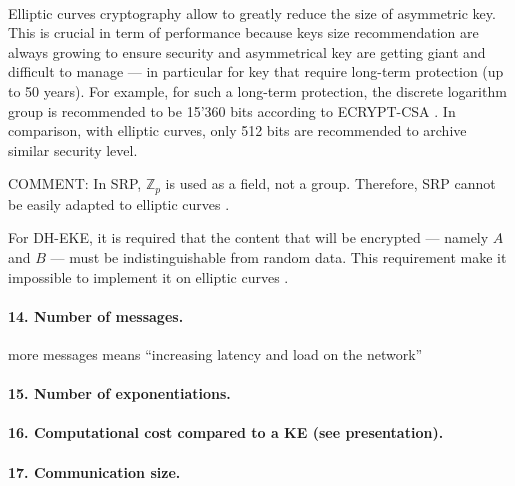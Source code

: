 \documentclass[../report.tex]{subfiles}
\begin{document}
\paragraph{}
Elliptic curves cryptography allow to greatly reduce the size of asymmetric key.
This is crucial in term of performance because keys size recommendation are always growing to ensure security and asymmetrical key are getting giant and difficult to manage --- in particular for key that require long-term protection (up to 50 years). For example, for such a long-term protection, the discrete logarithm group is recommended to be 15'360 bits according to ECRYPT-CSA \cite{https://www.keylength.com/en/3/}.
In comparison, with elliptic curves, only 512 bits are recommended to archive similar security level.

COMMENT: 
In SRP, $\mathbb{Z}_p$ is used as a field, not a group. Therefore, SRP cannot be easily adapted to elliptic curves \cite{CAA}.


For DH-EKE, it is required that the content that will be encrypted --- namely $A$ and $B$ --- must be indistinguishable from random data. 
This requirement make it impossible to implement it on elliptic curves \cite{https://tools.ietf.org/id/draft-ietf-kitten-krb-spake-preauth-00.html}. %


\paragraph{14. Number of messages.}
more messages means ``increasing latency and load on the network''


\paragraph{15. Number of exponentiations.}


\paragraph{16. Computational cost compared to a KE (see \cite{KHAPE_Paper} presentation).}


\paragraph{17. Communication size.}
\end{document}
